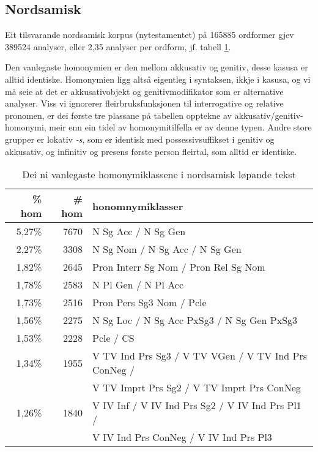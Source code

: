 \documentclass[a4paper,norsk]{article}
\begin{document}
\subsection{Nordsamisk}

Eit tilsvarande nordsamisk korpus (nytestamentet) på 165885 ordformer gjev 389524 analyser, eller 2,35 analyser per ordform, jf. tabell \ref{smehom}.%

Den vanlegaste homonymien er den mellom akkusativ og genitiv, desse kasusa er alltid identiske. Homonymien ligg altså eigentleg i syntaksen, ikkje i kasusa, og vi må seie at det er akkusativobjekt og genitivmodifikator som er alternative analyser. Viss vi ignorerer fleirbruksfunksjonen til interrogative og relative pronomen, er dei første tre plassane på tabellen opptekne av akkusativ/genitiv-homonymi, meir enn ein tidel av homonymitilfella er av denne typen. Andre store grupper er lokativ \emph{-s}, som er identisk med possessivsuffikset i genitiv og akkusativ, og infinitiv og presens første person fleirtal, som alltid er identiske.%


\begin{table}[htdp]
\caption{Dei ni vanlegaste homonymiklassene i nordsamisk løpande tekst}
\begin{center}
\begin{tabular}{|r|r|l|}
\hline
\% hom & \# hom & honomnymiklasser \\
\hline
5,27\% & 7670 & N Sg Acc /  N Sg Gen \\
2,27\% & 3308 & N Sg Nom /  N Sg Acc /  N Sg Gen \\
1,82\% & 2645 & Pron Interr Sg Nom /  Pron Rel Sg Nom \\
1,78\% & 2583 & N Pl Gen /  N Pl Acc \\
1,73\% & 2516 & Pron Pers Sg3 Nom /  Pcle \\
1,56\% & 2275 & N Sg Loc /  N Sg Acc PxSg3 /  N Sg Gen PxSg3 \\
1,53\% & 2228 & Pcle /  CS \\
1,34\% & 1955 & V TV Ind Prs Sg3 /  V TV VGen /  V TV Ind Prs ConNeg /  \\  
       &      & V TV Imprt Prs Sg2 /  V TV Imprt Prs ConNeg \\
1,26\% & 1840 & V IV Inf /  V IV Ind Prs Sg2 /  V IV Ind Prs Pl1 / \\
       &      & V IV Ind Prs ConNeg /  V IV Ind Prs Pl3 \\
\hline
\end{tabular}
\end{center}
\label{smehom}
\end{table}%
\end{document}
